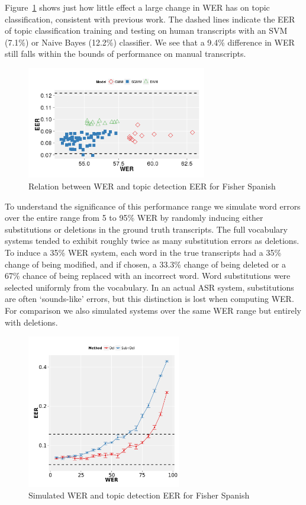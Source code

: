 Figure~\ref{ch3WER} shows just how little effect a large change in WER has on topic classification, consistent with previous work.  The dashed lines indicate the EER of topic classification training and testing on human transcripts with an SVM (7.1\%) or Naive Bayes (12.2\%) classifier.  We see that a 9.4\% difference in WER still falls within the bounds of performance on manual transcripts.
\begin{figure}[ht]
\centering
\includegraphics[width=0.7\textwidth]{graphs/ch3/svm-wer.png}
\caption[Effect of WER on Fisher Spanish EER]{Relation between WER and topic detection EER for Fisher Spanish\label{ch3WER}}
\end{figure}

To understand the significance of this performance range we simulate word errors over the entire range from 5 to 95\% WER by randomly inducing either substitutions or deletions in the ground truth transcripts.  The full vocabulary systems tended to exhibit roughly twice as many substitution errors as deletions.  To induce a 35\% WER system, each word  in the true transcripts had a 35\% change of being modified, and if chosen, a 33.3\% change of being deleted or a 67\% chance of being replaced with an incorrect word.  Word substitutions were selected uniformly from the vocabulary.  In an actual ASR system, substitutions are often `sounds-like' errors, but this distinction is lost when computing WER.  For comparison we also simulated systems over the same WER range but entirely with deletions.

\begin{figure}[t]
\centering
\includegraphics[width=0.6\textwidth]{graphs/ch3/gen-wer.png}
\caption[Simulated WER and Fisher Spanish EER]{Simulated WER and topic detection EER for Fisher Spanish\label{ch3genWER}}
\end{figure}

